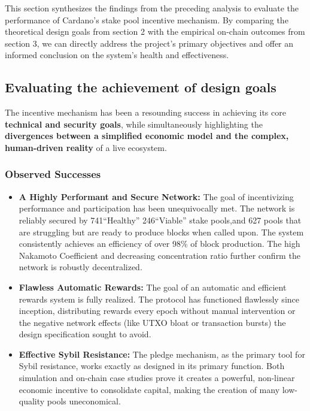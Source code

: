 \documentclass[11pt, letterpaper]{article}
\begin{document}
This section synthesizes the findings from the preceding analysis to evaluate the
performance of Cardano's stake pool incentive mechanism. By comparing the theoretical
design goals from section 2 with the empirical on-chain outcomes from section 3, we
can directly address the project's primary objectives and offer an informed conclusion
on the system's health and effectiveness.

\subsection{Evaluating the achievement of design goals}
\label{sec:evaluating-goals}

The incentive mechanism has been a resounding success in achieving its core
\textbf{technical and security goals}, while simultaneously highlighting the
\textbf{divergences between a simplified economic model and the complex, human-driven reality}
of a live ecosystem.

\subsubsection{Observed Successes}

\begin{itemize}
	\item \textbf{A Highly Performant and Secure Network:} The goal of incentivizing performance
	      and participation has been unequivocally met. The network is reliably secured by 741``Healthy''
	      246``Viable'' stake pools,and 627 pools that are struggling but are ready to produce blocks when called upon.
	      The system consistently achieves an efficiency of over 98\% of block production. The high Nakamoto Coefficient and decreasing concentration ratio further confirm the network is robustly decentralized.
	\item \textbf{Flawless Automatic Rewards:} The goal of an automatic and efficient rewards system is fully
	      realized. The protocol has functioned flawlessly since inception, distributing rewards every epoch
	      without manual intervention or the negative network effects (like UTXO bloat or transaction bursts) the
	      design specification sought to avoid.
	\item \textbf{Effective Sybil Resistance:} The pledge mechanism, as the primary tool for Sybil resistance,
	      works exactly as designed in its primary function. Both simulation and on-chain case studies prove
	      it creates a powerful, non-linear economic incentive to consolidate capital, making the creation
	      of many low-quality pools uneconomical.
\end{itemize}
\end{document}
